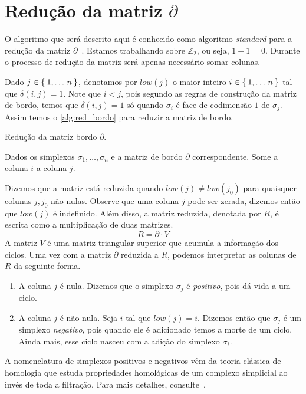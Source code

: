 \section{Redução da matriz $\partial$}
O algoritmo que será descrito aqui é conhecido como algoritmo \textit{standard}
para a redução da matriz $\partial$~\cite{Edelsbrunner2000}. Estamos trabalhando
sobre $\mathbb{Z}_2$, ou seja, $1+1 = 0$. Durante o processo de redução da matriz
será apenas necessário somar colunas.

Dado $j \in \Set{1,\dots\,n}$, denotamos por $low(j)$ o maior inteiro
$i \in \Set{1,\dots\,n} $ tal que $\delta(i,j)=1$. Note que $i < j$, pois segundo
as regras de construção da matriz de bordo, temos que $\delta(i,j) = 1$ só
quando $\sigma_i$ é face de codimensão $1$ de $\sigma_j$. Assim temos o
\autoref{alg:red_bordo} para reduzir a matriz de bordo.

\begin{algorithm}[htb]
  \caption{Redução da matriz bordo $\partial$.}
  \label{alg:red_bordo}
  \begin{algorithmic}[1]
    \State Dados os simplexos $\sigma_1, \dots, \sigma_n$ e a matriz de bordo
    $\partial$ correspondente.
        \State Some a coluna $i$ a coluna $j$.
      \EndWhile
    \EndFor
  \end{algorithmic}
\end{algorithm}

Dizemos que a matriz está reduzida quando $low(j) \neq low(j_0)$ para quaisquer
colunas $j,j_0$ não nulas. Observe que uma coluna $j$ pode ser zerada, dizemos
então que $low(j)$ é indefinido. Além disso, a matriz reduzida, denotada por
$R$, é escrita como a multiplicação de duas matrizes.
\begin{equation}
  \label{eq:red_matrix}
  R = \partial \cdot V
\end{equation}
A matriz $V$ é uma matriz triangular superior que acumula a informação dos
ciclos. Uma vez com a matriz $\partial$ reduzida a $R$, podemos interpretar as
colunas de $R$ da seguinte forma.
\begin{enumerate}
  \item A coluna $j$ é nula. Dizemos que o simplexo $\sigma_j$
  é \textit{positivo}, pois dá vida a um ciclo.
  \item A coluna $j$ é não-nula. Seja $i$ tal que $low(j)=i$.
  Dizemos então que $\sigma_j$ é um simplexo \textit{negativo}, pois quando
  ele é adicionado temos a morte de um ciclo. Ainda mais, esse ciclo nasceu com
  a adição do simplexo $\sigma_i$.
\end{enumerate}
A nomenclatura de simplexos positivos e negativos vêm da teoria clássica de homologia
que estuda propriedades homológicas de um complexo simplicial ao invés de toda
a filtração. Para mais detalhes, consulte~\cite{edelsbrunner2010computational}.

